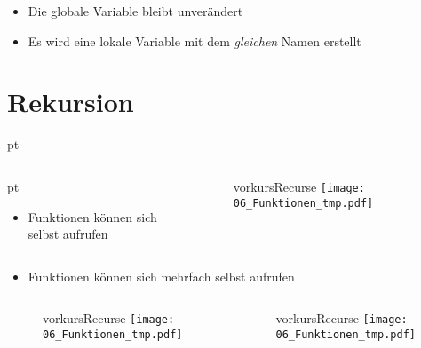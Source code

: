 \begin{frame}
	\slidehead
	\begin{itemize}
		\item Die globale Variable  bleibt unverändert
		\item Es wird eine lokale Variable mit dem \textit{gleichen} Namen erstellt
	\end{itemize}
\end{frame}

\livecoding

\section{Rekursion}
\begin{frame}[t]
	\slidehead

	 pt
	\begin{columns}
		\begin{column}{4.5cm}
			 pt
			\begin{itemize}
				\item Funktionen können sich selbst aufrufen
			\end{itemize}
		\end{column}

		\begin{column}{7cm}
			\begin{figure}
				\ifcsname vorkursRecurse\endcsname
					\texttt{[image: 06\_Funktionen\_tmp.pdf]}
				\fi
			\end{figure}
		\end{column}
	\end{columns}
\end{frame}

\begin{frame}[t]
	\slidehead

	\begin{itemize}
		\item Funktionen können sich mehrfach selbst aufrufen
	\end{itemize}

	\begin{columns}
		\begin{column}{5cm}
			\begin{figure}
				\ifcsname vorkursRecurse\endcsname
					\texttt{[image: 06\_Funktionen\_tmp.pdf]}
				\fi
			\end{figure}
		\end{column}

		\begin{column}{5cm}
			\begin{figure}
				\ifcsname vorkursRecurse\endcsname
					\texttt{[image: 06\_Funktionen\_tmp.pdf]}
				\fi
			\end{figure}
		\end{column}
	\end{columns}
\end{frame}

